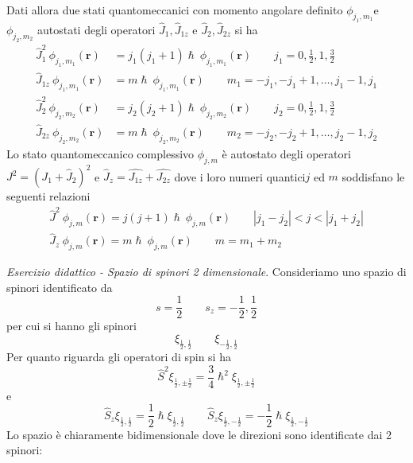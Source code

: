Dati allora due stati quantomeccanici con momento angolare definito
\(\phi_{j_{1},m_{1}}\)e \(\phi_{j_{2},m_{2}}\) autostati degli operatori
\(\hat{J}_{1},\hat{J}_{1z}\) e \(\hat{J}_{2}, \hat{J}_{2z}\) si ha
\begin{align*}
    \hat{J}_{1}^{2} \ \phi_{j_{1},m_{1}}(\bm{r}) &= j_{1}(j_{1}+1) \hslash \ \phi_{j_{1},m_{1}}(\bm{r}) \qquad j_{1} = 0, \frac{1}{2}, 1, \frac{3}{2}\\
    \hat{J}_{1z} \ \phi_{j_{1},m_{1}}(\bm{r}) &= m \hslash \ \phi_{j_{1},m_{1}}(\bm{r})  \qquad m_{1} = -j_{1} , -j_{1} +1, \dots , j_{1}-1, j_{1}\\
    \hat{J}_{2}^{2} \ \phi_{j_{2},m_{2}}(\bm{r}) &= j_{2}(j_{2}+1) \hslash \ \phi_{j_{2},m_{2}}(\bm{r}) \qquad j_{2} = 0, \frac{1}{2}, 1, \frac{3}{2}\\
    \hat{J}_{2z} \ \phi_{j_{2},m_{2}}(\bm{r}) &= m \hslash \ \phi_{j_{2},m_{2}}(\bm{r})  \qquad m_{2} = -j_{2} , -j_{2} +1, \dots , j_{2}-1, j_{2}
\end{align*}
Lo stato quantomeccanico complessivo \(\phi_{j,m}\) è autostato degli
operatori \(J^{2} = (J_{1} + \hat{J}_{2})^{2}\) e
\(\hat{J}_{z} = \hat{J_{1z}} + \hat{J_{2z}}\) dove i loro numeri
quantici\(j\) ed \(m\) soddisfano le seguenti relazioni \begin{gather*}
                                                            \hat{J}^{2} \ \phi_{j,m}(\bm{r}) = j(j+1) \hslash \ \phi_{j,m}(\bm{r}) \qquad | j_{1} - j_{2}|<j<|j_{1}+j_{2}|\\
                                                            \hat{J}_{z} \ \phi_{j,m}(\bm{r}) = m \hslash \ \phi_{j,m}(\bm{r})  \qquad m = m_{1}+m_{2}
\end{gather*}

\emph{Esercizio didattico - Spazio di spinori 2 dimensionale}.
Consideriamo uno spazio di spinori identificato da \[
                                                       s = \frac{1}{2} \qquad s_{z} = - \frac{1}{2} , \frac{1}{2}
\] per cui si hanno gli spinori \[
                                    \xi_{\frac{1}{2}, \frac{1}{2}} \qquad \xi_{- \frac{1}{2}, \frac{1}{2}}
\] Per quanto riguarda gli operatori di spin si ha \[
                                                       \hat{S}^{2} \xi_{\frac{1}{2}, \pm \frac{1}{2}} = \frac{3}{4} \hslash^{2} \xi_{\frac{1}{2}, \pm \frac{1}{2}}
\] e \[
         \hat{S}_{z} \xi_{\frac{1}{2}, \frac{1}{2}} = \frac{1}{2} \hslash \xi_{\frac{1}{2}, \frac{1}{2}} \qquad
         \hat{S}_{z} \xi_{\frac{1}{2}, - \frac{1}{2}} = - \frac{1}{2} \hslash \xi_{\frac{1}{2}, -\frac{1}{2}}
\] Lo spazio è chiaramente bidimensionale dove le direzioni sono
identificate dai 2 spinori:


